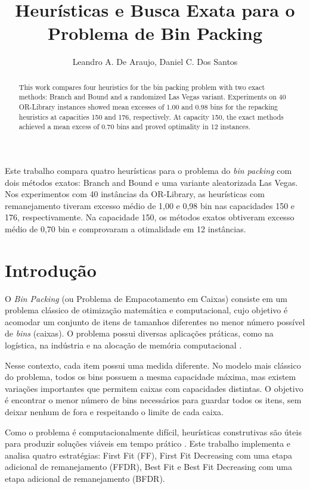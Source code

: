 \documentclass[12pt]{article}
\title{Heurísticas e Busca Exata para o Problema de Bin Packing}
\author{Leandro A. De Araujo\inst{1}, Daniel C. Dos Santos\inst{1}}
\begin{document}
 

\maketitle

\begin{abstract}
This work compares four heuristics for the bin packing problem with two exact methods: Branch and Bound and a randomized Las Vegas variant. Experiments on 40 OR-Library instances showed mean excesses of 1.00 and 0.98 bins for the repacking heuristics at capacities 150 and 176, respectively. At capacity 150, the exact methods achieved a mean excess of 0.70 bins and proved optimality in 12 instances.
\end{abstract}

\begin{resumo}
Este trabalho compara quatro heurísticas para o problema do \textit{bin packing} com dois métodos exatos: Branch and Bound e uma variante aleatorizada Las Vegas. Nos experimentos com 40 instâncias da OR-Library, as heurísticas com remanejamento tiveram excesso médio de 1,00 e 0,98 bin nas capacidades 150 e 176, respectivamente. Na capacidade 150, os métodos exatos obtiveram excesso médio de 0,70 bin e comprovaram a otimalidade em 12 instâncias.
\end{resumo}

\section{Introdução}

O \textit{Bin Packing} (ou Problema de Empacotamento em Caixas) consiste em um problema clássico de otimização matemática e computacional, cujo objetivo é acomodar um conjunto de itens de tamanhos diferentes no menor número possível de \textit{bins} (caixas). O problema possui diversas aplicações práticas, como na logística, na indústria e na alocação de memória computacional \cite{ambrose2025}.

Nesse contexto, cada item possui uma medida diferente. No modelo mais clássico do problema, todos os bins possuem a mesma capacidade máxima, mas existem variações importantes que permitem caixas com capacidades distintas. O objetivo é encontrar o menor número de bins necessários para guardar todos os itens, sem deixar nenhum de fora e respeitando o limite de cada caixa.

Como o problema é computacionalmente difícil, heurísticas construtivas são úteis para produzir soluções viáveis em tempo prático \cite{ambrose2025}. Este trabalho implementa e analisa quatro estratégias: First Fit (FF), First Fit Decreasing com uma etapa adicional de remanejamento (FFDR), Best Fit e Best Fit Decreasing com uma etapa adicional de remanejamento (BFDR).
\end{document}
